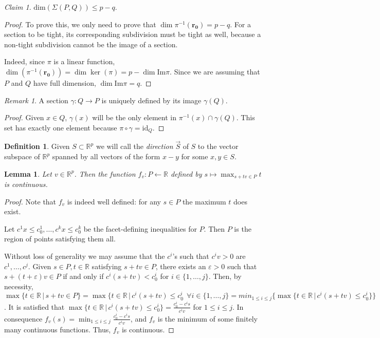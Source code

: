 \documentclass[10pt,a4paper]{article}
\newcommand{\RR}{\mathbb{R}}
\newcommand{\eps}{\varepsilon}
\theoremstyle{plain}
\newtheorem{lemma}{Lemma}
\theoremstyle{remark}
\newtheorem{claim}{Claim}
\newtheorem{remark}{Remark}
\theoremstyle{definition}
\newtheorem{definition}{Definition}
\begin{document}
    \begin{claim}
        $\mbox{dim}(\Sigma(P,Q)) \leq p-q$.
    \end{claim}
    \begin{proof}
        To prove this, we only need to prove that 
        $\dim \pi^{-1}(\bm{r_0}) = p-q$. For a section to be tight, 
        its corresponding subdivision must be tight as well, 
        because a non-tight subdivision cannot be the image of a section.
        
        Indeed, since $\pi$ is a linear function, 
        $\dim(\pi^{-1}(\bm{r_0})) = \dim \ker(\pi) = p - \dim \mbox{Im} \pi$.
        Since we are assuming that $P$ and $Q$ have full dimension,
        ${\dim\mbox{Im}\pi=q}$.
    \end{proof}
    \begin{remark}
        A section $\gamma:Q\to P$ is uniquely defined by its image $\gamma (Q)$.
    \end{remark}
    \begin{proof}
        Given $x\in Q$, $\gamma(x)$ will be the only element in 
        $\pi^{-1}(x)\cap \gamma(Q)$. 
        This set has exactly one element because $\pi\circ \gamma = \mathrm{id}_Q$.
    \end{proof}
    
    \begin{definition} 
        Given $S\subset \RR^p$ we will call the \emph{direction}
        $\overrightarrow{S}$ of $S$ to the vector subspace of $\RR^p$ 
        spanned by all vectors of the form $x-y$ for some $x,y\in S$. 
    \end{definition}
    
    \begin{lemma}
        Let $v\in \RR^p$. Then the function $f_v: P\leftarrow \RR$ defined by $s\mapsto \max_{s + tv\in P} t$ is continuous. 
    \end{lemma}
    \begin{proof} Note that $f_v$ is indeed well defined: for any $s\in P$ the maximum $t$ does exist.%
        \par
        Let $c^1x\leq c^1_0,\dots, c^kx\leq c^k_0$ be the facet-defining inequalities for $P$.
        Then $P$ is the region of points satisfying them all. \par
        Without loss of generality we may assume that the $c^i$'s such that $c^iv>0$ are $c^1,\dots, c^j$.
        Given $s\in P, t\in \RR$ satisfying $s + tv \in P$, 
        there exists an $\eps > 0$ such that $s + (t+ \eps)v\in P$ if and only if 
        $c^i(s+tv) < c^i_0$ for $i\in \{1,\dots, j\}$. %
        Then, by necessity, $ \max \{t\in \RR \, | \, s + tv\in P\}=
        \max \{ t \in \RR \, | \, c^i(s+tv) \leq c^i_0 \ \ \forall i \in \{1,\dots, j\} =
        min_{1\leq i \leq j} \{\max \{ t \in \RR \,| \, c^i(s+tv)\leq c^i_0\}\}$.
        It is satisfied that $\max \{ t \in \RR \,| \, c^i(s+tv)\leq c^i_0\}=
        \frac{c^i_0-c^is}{c^iv}$ for $1\leq i \leq j$. 
        In consequence $f_v(s)=\min_{1\leq i \leq j} \frac{c^i_0-c^is}{c^iv}$,
        and $f_v$ is the minimum of some finitely many continuous functions.
        Thus, $f_v$ is continuous. 
    \end{proof}
    
\end{document}
